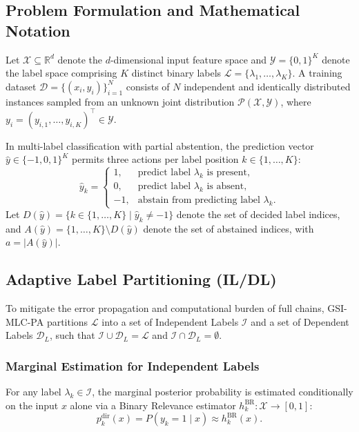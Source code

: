 \documentclass[conference]{IEEEtran}
\begin{document}
\subsection{Problem Formulation and Mathematical Notation}
Let $\mathcal{X} \subseteq \mathbb{R}^d$ denote the $d$-dimensional input feature space and $\mathcal{Y} = \{0, 1\}^K$ denote the label space comprising $K$ distinct binary labels $\mathcal{L} = \{\lambda_1, \dots, \lambda_K\}$. A training dataset $\mathcal{D} = \{(x_i, y_i)\}_{i=1}^N$ consists of $N$ independent and identically distributed instances sampled from an unknown joint distribution $\mathcal{P}(\mathcal{X}, \mathcal{Y})$, where $y_i = (y_{i,1}, \dots, y_{i,K})^\top \in \mathcal{Y}$.

In multi-label classification with partial abstention, the prediction vector $\hat{y} \in \{-1, 0, 1\}^K$ permits three actions per label position $k \in \{1, \dots, K\}$:
\begin{equation}
    \hat{y}_k = \begin{cases}
        1, & \text{predict label } \lambda_k \text{ is present}, \\
        0, & \text{predict label } \lambda_k \text{ is absent}, \\
        -1, & \text{abstain from predicting label } \lambda_k.
    \end{cases}
\end{equation}
Let $D(\hat{y}) = \{k \in \{1, \dots, K\} \mid \hat{y}_k \neq -1\}$ denote the set of decided label indices, and $A(\hat{y}) = \{1, \dots, K\} \setminus D(\hat{y})$ denote the set of abstained indices, with $a = |A(\hat{y})|$.

\subsection{Adaptive Label Partitioning (IL/DL)}
To mitigate the error propagation and computational burden of full chains, GSI-MLC-PA partitions $\mathcal{L}$ into a set of Independent Labels $\mathcal{I}$ and a set of Dependent Labels $\mathcal{D}_L$, such that $\mathcal{I} \cup \mathcal{D}_L = \mathcal{L}$ and $\mathcal{I} \cap \mathcal{D}_L = \emptyset$.

\subsubsection{Marginal Estimation for Independent Labels}
For any label $\lambda_k \in \mathcal{I}$, the marginal posterior probability is estimated conditionally on the input $x$ alone via a Binary Relevance estimator $h_k^{\text{BR}}: \mathcal{X} \to [0, 1]$:
\begin{equation}
    p_k^{\text{dir}}(x) = P(y_k = 1 \mid x) \approx h_k^{\text{BR}}(x).
\end{equation}
\end{document}
